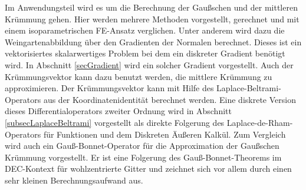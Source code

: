 Im Anwendungsteil wird es um die Berechnung der Gaußschen und der mittleren Krümmung gehen.
Hier werden mehrere Methoden vorgestellt, gerechnet und mit einem isoparametrischen FE-Ansatz verglichen.
Unter anderem wird dazu die Weingartenabbildung über den Gradienten der Normalen berechnet.
Dieses ist ein vektorisiertes skalarwertiges Problem bei dem ein diskreter Gradient benötigt wird.
In Abschnitt \ref{secGradient} wird ein solcher Gradient vorgestellt.
Auch der Krümmungsvektor kann dazu benutzt werden, die mittlere Krümmung zu approximieren.
Der Krümmungsvektor kann mit Hilfe des Laplace-Beltrami-Operators aus der Koordinatenidentität berechnet werden.
Eine diskrete Version dieses Differentialoperators zweiter Ordnung wird in Abschnitt \ref{subsecLaplaceBeltrami} vorgestellt als direkte Folgerung
des Laplace-de-Rham-Operators für Funktionen und dem Diskreten Äußeren Kalkül.
Zum Vergleich wird auch ein Gauß-Bonnet-Operator für die Approximation der Gaußschen Krümmung vorgestellt.
Er ist eine Folgerung des Gauß-Bonnet-Theorems im DEC-Kontext für wohlzentrierte Gitter und zeichnet sich vor allem durch einen sehr kleinen Berechnungsaufwand aus.
